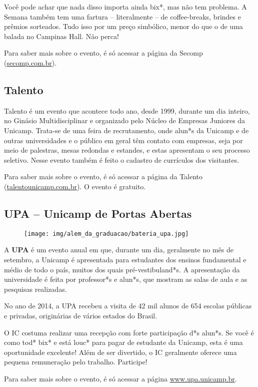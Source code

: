 Você pode achar que nada disso importa ainda bix*, mas não tem problema.  A
Semana também tem uma fartura -- literalmente -- de coffee-breaks, brindes e
prêmios sorteados. Tudo isso por um preço simbólico, menor do que o de uma
balada no Campinas Hall. Não perca!

Para saber mais sobre o evento, é só acessar a página da Secomp
(\url{secomp.com.br}).

\subsection{Talento}

Talento é um evento que acontece todo ano, desde 1999, durante um dia inteiro,
no Ginásio Multidisciplinar e organizado pelo Núcleo de Empresas Juniores da
Unicamp. Trata-se de uma feira de recrutamento, onde alun*s da Unicamp e de
outras universidades e o público em geral têm contato com empresas, seja por
meio de palestras, mesas redondas e estandes, e estas apresentam o seu processo
seletivo. Nesse evento também é feito o cadastro de currículos dos visitantes.

Para saber mais sobre o evento, é só acessar a página da Talento
(\url{talentounicamp.com.br}). O evento é gratuito.

\subsection{UPA -- Unicamp de Portas Abertas}

\begin{figure}[h!]
    \centering
    \texttt{[image: img/alem\_da\_graduacao/bateria\_upa.jpg]}
\end{figure}

A \textbf{UPA} é um evento anual em que, durante um dia, geralmente no mês de
setembro, a Unicamp é apresentada para estudantes dos ensinos fundamental e
médio de todo o país, muitos dos quais pré-vestibuland*s. A apresentação da
universidade é feita por professor*s e alun*s, que mostram as salas de aula e as
pesquisas realizadas.

No ano de 2014, a UPA recebeu a visita de 42 mil alunos de 654 escolas públicas
e privadas, originárias de vários estados do Brasil.

O IC costuma realizar uma recepção com forte participação d*s alun*s. Se você é
como tod* bix* e está louc* para pagar de estudante da Unicamp, esta é uma
oportunidade excelente! Além de ser divertido, o IC geralmente oferece uma
pequena remuneração pelo trabalho. Participe!

Para saber mais sobre o evento, é só acessar a página \url{www.upa.unicamp.br}.
